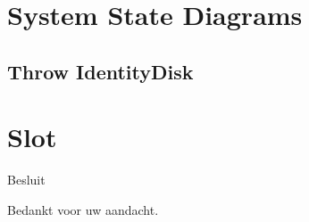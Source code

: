 \documentclass[t]{beamer}
\begin{document}
\section{System State Diagrams}

\subsection{Throw IdentityDisk}
\begin{frame}
\begin{center}

\end{center}
\end{frame}


\section{Slot}
\begin{frame}{Besluit}
\vspace{0.8in}
\begin{center}
Bedankt voor uw aandacht.
\end{center}
\end{frame}
\end{document}
